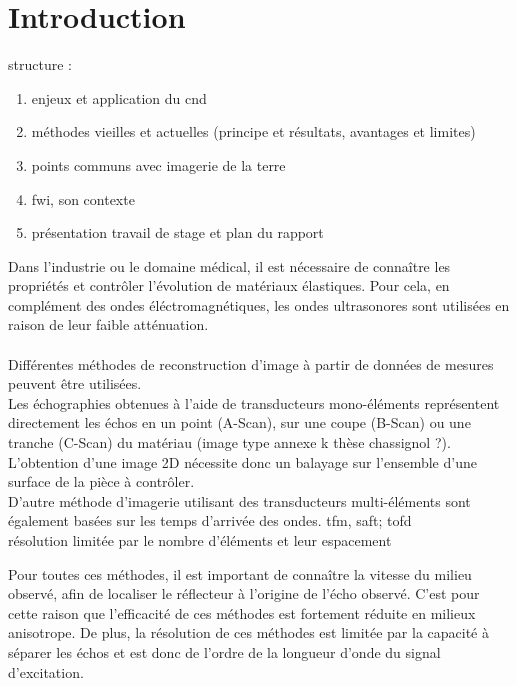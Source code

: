 \chapter{Introduction}

structure :
\begin{enumerate}
	\item enjeux et application du cnd
	\item méthodes vieilles et actuelles (principe et résultats, avantages et limites)
	\item points communs avec imagerie de la terre
	\item fwi, son contexte
	\item présentation travail de stage et plan du rapport
\end{enumerate}



Dans l'industrie ou le domaine médical, il est nécessaire de connaître les propriétés et contrôler l'évolution de matériaux élastiques. Pour cela, en complément des ondes éléctromagnétiques,  les ondes ultrasonores sont utilisées en raison de leur faible atténuation.\\~\\


Différentes méthodes de reconstruction d'image à partir de données de mesures peuvent être utilisées.\\

Les échographies obtenues à l'aide de transducteurs mono-éléments représentent directement les échos en un point (A-Scan), sur une coupe (B-Scan) ou une tranche (C-Scan) du matériau (image type annexe k thèse chassignol ?). L'obtention d'une image 2D nécessite donc un balayage sur l'ensemble d'une surface de la pièce à contrôler. \\

D'autre méthode d'imagerie utilisant des transducteurs multi-éléments sont également basées sur les temps d'arrivée des ondes.  tfm, saft; tofd\\
résolution limitée par le nombre d'éléments et leur espacement


Pour toutes ces méthodes, il est important de connaître la vitesse du milieu observé, afin de localiser le réflecteur à l'origine de l'écho observé. C'est pour cette raison que l'efficacité de ces méthodes est fortement réduite en milieux anisotrope.  
De plus, la résolution de ces méthodes est limitée par la capacité à séparer les échos et est donc de l'ordre de la longueur d'onde du signal d'excitation. 
  



